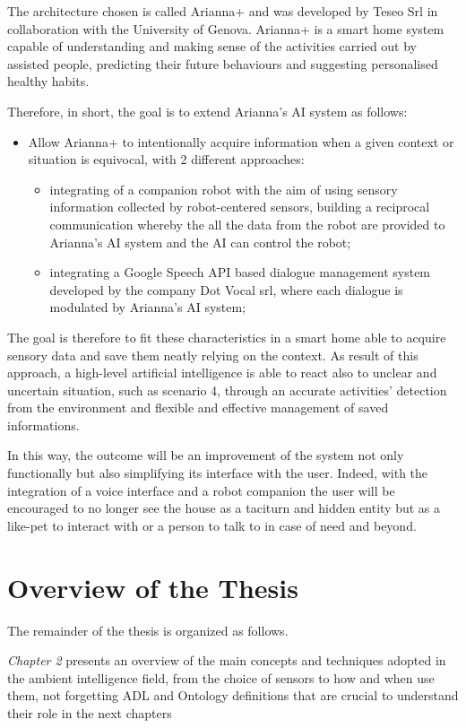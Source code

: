 \documentclass{thesisreport}
\begin{document}
 The architecture chosen is called Arianna+ and was developed by Teseo Srl in collaboration with the University of Genova. Arianna+ is a smart home system capable of understanding and making sense of the activities carried out by assisted people, predicting their future behaviours and suggesting personalised healthy habits.
 
 Therefore, in short, the goal is to extend Arianna's AI system as follows:
 \begin{itemize}
     \item Allow Arianna+ to intentionally acquire information when a given context or situation is equivocal, with 2 different approaches:
     \begin{itemize}
         \item integrating of a companion robot with the aim of using sensory information collected by robot-centered sensors, building a reciprocal communication whereby the   all the data from the robot are provided to Arianna’s AI system and the AI can control the robot;
         \item integrating a Google Speech API based dialogue management system developed by the company Dot Vocal srl, where each dialogue is modulated by Arianna’s AI system; 
     \end{itemize}
 \end{itemize}

 The goal is therefore to fit these characteristics in a smart home able to acquire sensory data and save them neatly relying on the context. As result of this approach, a high-level artificial intelligence is able to react also to unclear and uncertain situation, such as scenario 4, through an accurate activities’ detection from the environment and flexible and effective management of saved informations.
 
 In this way, the outcome will be an improvement of the system not only functionally but also simplifying its interface with the user.
 Indeed, with the integration of a voice interface and a robot companion the user will be encouraged to no longer see the house as a taciturn and hidden entity but as a like-pet to interact with or a person to talk to in case of need and beyond.
 
\section{Overview of the Thesis}
The remainder of the thesis is organized as follows. 

\quad \textit{Chapter 2} presents an overview of the main concepts and techniques adopted in the ambient intelligence field, from the choice of sensors to how and when use them, not forgetting ADL and Ontology definitions that are crucial to understand their role in the next chapters
\end{document}
